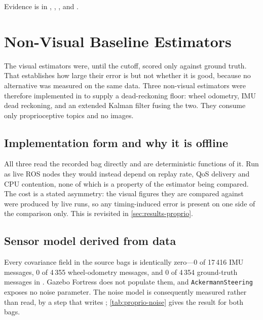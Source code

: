 Evidence is in ,
,
,
and .

\section{Non-Visual Baseline Estimators}
\label{sec:proprio-method}

The visual estimators were, until the cutoff, scored only against ground truth.
That establishes how large their error is but not whether it is good, because no
alternative was measured on the same data. Three non-visual estimators were
therefore implemented in  to supply a
dead-reckoning floor: wheel odometry, IMU dead reckoning, and an extended Kalman
filter fusing the two. They consume only proprioceptive topics and no images.

\subsection{Implementation form and why it is offline}

All three read the recorded bag directly and are deterministic functions of it.
Run as live ROS nodes they would instead depend on replay rate, QoS delivery and
CPU contention, none of which is a property of the estimator being compared. The
cost is a stated asymmetry: the visual figures they are compared against were
produced by live runs, so any timing-induced error is present on one side of the
comparison only. This is revisited in \cref{sec:results-proprio}.

\subsection{Sensor model derived from data}

Every covariance field in the source bags is identically zero---0 of 17\,416 IMU
messages, 0 of 4\,355 wheel-odometry messages, and 0 of 4\,354 ground-truth
messages in . Gazebo Fortress does not populate them,
and \texttt{AckermannSteering} exposes no noise parameter. The noise model is
consequently measured rather than read, by a  step that writes
; \cref{tab:proprio-noise} gives the result for both bags.


